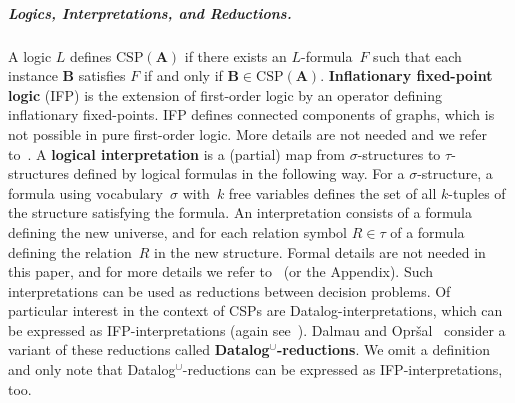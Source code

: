 \documentclass[a4paper,english, thm-restate]{lipics-v2021}
\newcommand{\defining}[1]{\textbf{#1}}
\newcommand{\StructA}{\mathbf{A}}
\newcommand{\StructB}{\mathbf{B}}
\newcommand{\CSP}[1]{\mathrm{CSP}(#1)}
\begin{document}
	
	
	
	
	
	
	
	
	
	
	
	
	
	
	
	
	
	
	
	
	\subparagraph{Logics, Interpretations, and Reductions.}
	A logic $L$ defines $\CSP{\StructA}$ if there exists an $L$\nobreakdash-formula~$F$
	such that each instance $\StructB$ satisfies $F$ if and only if $\StructB \in \CSP{\StructA}$.
	\defining{Inflationary fixed-point logic} (IFP) is the extension of first-order logic
	by an operator defining inflationary fixed-points.
	IFP defines connected components of graphs, which is not possible in pure first-order logic.
	More details are not needed and we refer to~\cite[Chapter~8.1]{EbbinghausFlum1995}.
	A \defining{logical interpretation} is a (partial) map from $\sigma$\nobreakdash-structures
	to $\tau$\nobreakdash-structures defined by logical formulas in the following way. 
	For a $\sigma$-structure, a formula using vocabulary~$\sigma$ with~$k$ free variables defines the set of all $k$-tuples of the structure satisfying the formula.
	An interpretation consists of a formula defining the new universe,
	and for each relation symbol $R\in \tau$ of a formula defining the relation~$R$ in the new structure.
	Formal details are not needed in this paper, and for more details we refer to~\cite[Section~11.2]{EbbinghausFlum1995} (or the Appendix).
	Such interpretations can be used as reductions between decision problems.
	Of particular interest in the context of CSPs are Datalog-interpretations,
	which can be expressed as IFP-interpretations (again see~\cite[Theorem~9.1.4]{EbbinghausFlum1995}).
	Dalmau and Opr\v{s}al~\cite{DalmauOprsal2024} consider a variant of these reductions called \defining{Datalog$^\cup$-reductions}.
	We omit a definition and only
	note that Datalog$^\cup$-reductions can be expressed as IFP-interpretations, too.
	
	
	
\end{document}
